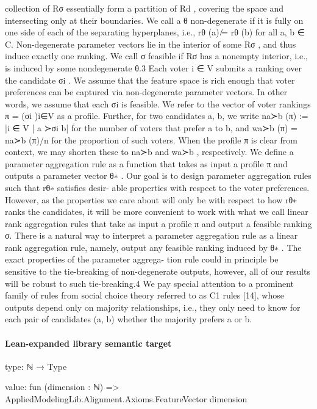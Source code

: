 \documentclass[10pt]{article}
\begin{document}
\begin{ReviewVerbatim}
collection of {Rσ } essentially form a partition of Rd , covering the space and intersecting only at
their boundaries.
We call a θ non-degenerate if it is fully on one side of each of the separating hyperplanes, i.e.,
rθ (a) ̸= rθ (b) for all a, b ∈ C. Non-degenerate parameter vectors lie in the interior of some Rσ ,
and thus induce exactly one ranking. We call σ feasible if Rσ has a nonempty interior, i.e., is induced
by some nondegenerate θ.3
Each voter i ∈ V submits a ranking over the candidate σi . We assume that the feature space is
rich enough that voter preferences can be captured via non-degenerate parameter vectors. In other
words, we assume that each σi is feasible. We refer to the vector of voter rankings π = (σi )i∈V as
a profile. Further, for two candidates a, b, we write na≻b (π) := |{i ∈ V | a ≻σi b}| for the number
of voters that prefer a to b, and wa≻b (π) = na≻b (π)/n for the proportion of such voters. When the
profile π is clear from context, we may shorten these to na≻b and wa≻b , respectively.
We define a parameter aggregation rule as a function that takes as input a profile π and outputs a
parameter vector θ∗ . Our goal is to design parameter aggregation rules such that rθ∗ satisfies desir-
able properties with respect to the voter preferences. However, as the properties we care about will
only be with respect to how rθ∗ ranks the candidates, it will be more convenient to work with what
we call linear rank aggregation rules that take as input a profile π and output a feasible ranking σ.
There is a natural way to interpret a parameter aggregation rule as a linear rank aggregation rule,
namely, output any feasible ranking induced by θ∗ . The exact properties of the parameter aggrega-
tion rule could in principle be sensitive to the tie-breaking of non-degenerate outputs, however, all
of our results will be robust to such tie-breaking.4
We pay special attention to a prominent family of rules from social choice theory referred to as C1
rules [14], whose outputs depend only on majority relationships, i.e., they only need to know for
each pair of candidates (a, b) whether the majority prefers a or b.
\end{ReviewVerbatim}



\paragraph{Lean-expanded library semantic target}
\begin{ReviewVerbatim}
type:
ℕ → Type

value:
fun (dimension : ℕ) => AppliedModelingLib.Alignment.Axioms.FeatureVector dimension
\end{ReviewVerbatim}
\end{document}
